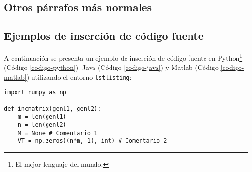 	\subsection{Otros párrafos más normales}
	
		\lipsum[7]
		
		\newp \lipsum[2]
		
	
		\lipsum[4]
		
		\begin{multicols}{2}
			
			\lipsum[4]
			
			
			\lipsum[1]
			
		\end{multicols}
		
	\subsection{Ejemplos de inserción de código fuente}
		
		A continuación se presenta un ejemplo de inserción de código fuente en Python\footnote{El mejor lenguaje del mundo.} (Código \ref{codigo-python}), Java (Código \ref{codigo-java}) y Matlab (Código \ref{codigo-matlab}) utilizando el entorno \texttt{lstlisting}:
		
\begin{lstlisting}[style=Python, caption={Ejemplo en Python.\label{codigo-python}}]
import numpy as np

def incmatrix(genl1, genl2):
	m = len(genl1)
	n = len(genl2)
	M = None # Comentario 1
	VT = np.zeros((n*m, 1), int) # Comentario 2
\end{lstlisting}



